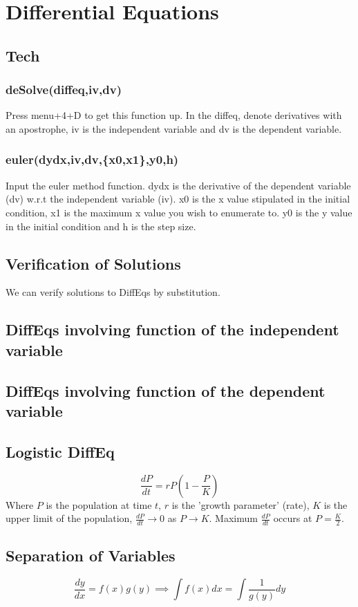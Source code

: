 \documentclass[a4paper,twoside]{article}
\begin{document}
	\section{Differential Equations}
		\subsection{Tech}
			\subsubsection{deSolve(diffeq,iv,dv)} Press menu+4+D to get this function up. In the diffeq, denote derivatives with an apostrophe, iv is the independent variable and dv is the dependent variable.
			
			\subsubsection{euler(dydx,iv,dv,\{x0,x1\},y0,h)} Input the euler method function. dydx is the derivative of the dependent variable (dv) w.r.t the independent variable (iv). x0 is the x value stipulated in the initial condition, x1 is the maximum x value you wish to enumerate to. y0 is the y value in the initial condition and h is the step size.
		\subsection{Verification of Solutions}
			We can verify solutions to DiffEqs by substitution.
		\subsection{DiffEqs involving function of the independent variable}
		\subsection{DiffEqs involving function of the dependent variable}
		\subsection{Logistic DiffEq}
			\[
				\frac{dP}{dt}=rP\left(1-\frac{P}{K}\right)
			\]
			Where $P$ is the population at time $t$, $r$ is the 'growth parameter' (rate), $K$ is the upper limit of the population, $\frac{dP}{dt}\to0$ as $P\to K$. Maximum $\frac{dP}{dt}$ occurs at $P=\frac{K}{2}$.
		\subsection{Separation of Variables}
			\[
				\frac{dy}{dx}=f(x)g(y) \implies \int f(x)dx=\int\frac{1}{g(y)}dy
			\]
\end{document}
